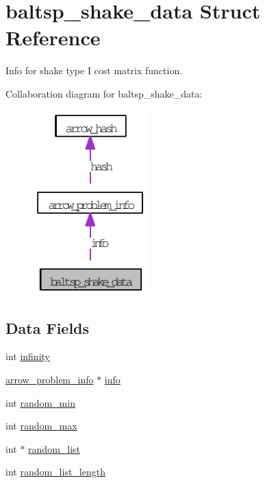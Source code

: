 \hypertarget{structbaltsp__shake__data}{
\section{baltsp\_\-shake\_\-data Struct Reference}
\label{structbaltsp__shake__data}
}
Info for shake type I cost matrix function.  


Collaboration diagram for baltsp\_\-shake\_\-data:\nopagebreak
\begin{figure}[H]
\begin{center}
\leavevmode
\includegraphics[width=126pt]{structbaltsp__shake__data__coll__graph}
\end{center}
\end{figure}
\subsection*{Data Fields}
\begin{CompactItemize}
\item 
int \hyperlink{structbaltsp__shake__data_850137b81fe1ba06ba33e37fc15bdaa3}{infinity}
\item 
\hyperlink{structarrow__problem__info}{arrow\_\-problem\_\-info} $\ast$ \hyperlink{structbaltsp__shake__data_9175ba75e968eb15f5313d626cde03ad}{info}
\item 
int \hyperlink{structbaltsp__shake__data_be2ebebdb37a3ff79d221c8793f8745e}{random\_\-min}
\item 
int \hyperlink{structbaltsp__shake__data_4a9235d8af82165777da9bf0b721bb5a}{random\_\-max}
\item 
int $\ast$ \hyperlink{structbaltsp__shake__data_2a89132e849b979fc187dc9fb180397e}{random\_\-list}
\item 
int \hyperlink{structbaltsp__shake__data_01579fcf6bec2dbaf736a5f8e0f21950}{random\_\-list\_\-length}
\end{CompactItemize}


